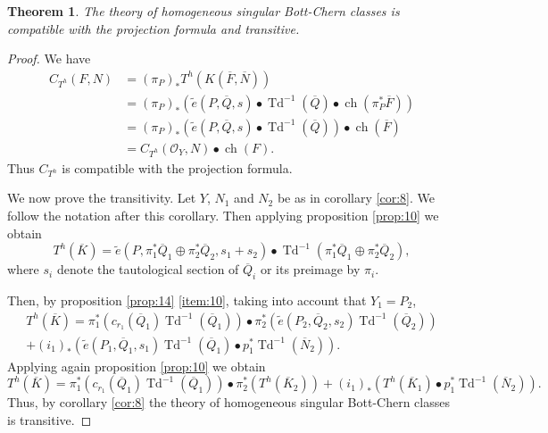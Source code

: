 \documentclass[10pt,twoside]{article}
\numberwithin{equation}{section}
\theoremstyle{plain}
\newtheorem{theorem}[equation]{Theorem}
\theoremstyle{definition}
\DeclareMathOperator{\Td}{Td}
\DeclareMathOperator{\ch}{ch}
\begin{document}
\begin{theorem}\label{thm:10}
  The theory of homogeneous singular Bott-Chern classes is compatible
  with the projection formula and transitive.
\end{theorem}
\begin{proof}
  We have
  \begin{align*}
    \label{eq:72}
    C_{T^{h}}(F,N)&=(\pi _{P})_{\ast}T^{h}(K(\overline F,\overline
    N))\\
    &=(\pi _{P})_{\ast}(\widetilde e(P,\overline
  Q,s)\bullet \Td^{-1}(\overline Q)\bullet\ch(\pi
    _{P}^{\ast}\overline F))\\
    &=(\pi _{P})_{\ast}(\widetilde e(P,\overline
  Q,s)\bullet \Td^{-1}(\overline Q))\bullet\ch(\overline F)\\
  &=C_{T^{h}}(\mathcal{O}_{Y},N)\bullet \ch(F).
  \end{align*}
  Thus $C_{T^{h}}$ is compatible with the projection formula.
  
  We now prove the transitivity. Let $Y$, $N_{1}$ and $N_{2}$ be as in
  corollary \ref{cor:8}. We follow the notation after this
  corollary. Then applying proposition \ref{prop:10} we obtain
  \begin{equation}\label{eq:74}
    T^{h}(\overline K)=\widetilde e(P,\pi _{1}^{\ast}\overline
    Q_{1}\oplus \pi _{2}^{\ast}\overline Q_{2},s_{1}+s_{2})\bullet
    \Td^{-1}(\pi _{1}^{\ast}\overline
    Q_{1}\oplus \pi _{2}^{\ast}\overline Q_{2}),
  \end{equation}
  where $s_{i}$ denote the tautological section of
  $\overline Q_{i}$ or its preimage by $\pi _{i}$.

  Then, by proposition \ref{prop:14} \ref{item:10}, taking into
  account that $Y_{1}=P_{2}$,
  \begin{multline}
    \label{eq:75}
    T^{h}(\overline K)=\pi _{1}^{\ast}(c_{r_{1}}(\overline
    Q_{1})\Td^{-1}(\overline Q_{1})) \bullet \pi _{2}^{\ast}(
    \widetilde e(P_{2},\overline Q_{2},s_{2})\Td^{-1}(\overline
    Q_{2})) \\+
    (i_{1})_{\ast}(\widetilde e(P_{1},\overline Q_{1},s_{1})\Td^{-1}(\overline
    Q_{1})\bullet p_{1}^{\ast}\Td^{-1}(\overline N_{2})).
  \end{multline}
  Applying again proposition \ref{prop:10} we obtain
  \begin{equation}
    \label{eq:76}
    T^{h}(\overline K)=\pi _{1}^{\ast}(c_{r_{1}}(\overline
    Q_{1})\Td^{-1}(\overline Q_{1})) \bullet \pi _{2}^{\ast}(
    T^{h}(\overline K_{2})) +
    (i_{1})_{\ast}(T^{h}(\overline K_{1})\bullet 
    p_{1}^{\ast}\Td^{-1}(\overline N_{2})).
  \end{equation}
  Thus, by corollary \ref{cor:8} the theory of homogeneous singular
  Bott-Chern classes is transitive.
\end{proof}
\end{document}
